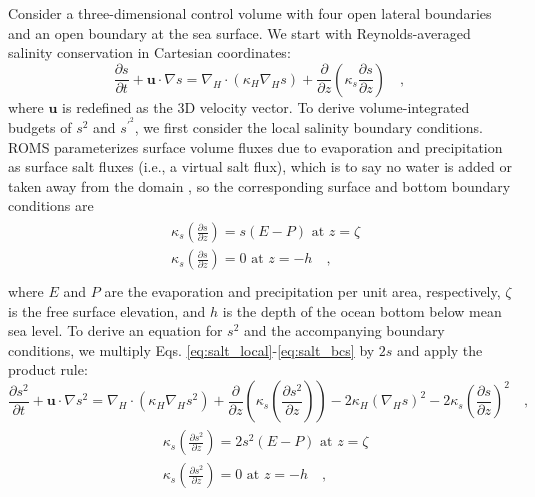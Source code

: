 Consider a three-dimensional control volume with four open lateral boundaries and an open boundary at the sea surface. We start with Reynolds-averaged salinity conservation in Cartesian coordinates:
\begin{equation} \label{eq:salt_local}
    \frac{\partial s}{\partial t}+ \textbf{u} \cdot \nabla s =\nabla_H \cdot (\kappa_H \nabla_H s)+  \frac{\partial}{\partial z} \left(\kappa_s {\frac{\partial s}{\partial z}} \right) \quad ,
\end{equation}
where $\mathbf{u}$ is redefined as the 3D velocity vector. To derive volume-integrated budgets of $s^2$ and $s^{\prime^2}$, we first consider the local salinity boundary conditions. ROMS parameterizes surface volume fluxes due to evaporation and precipitation as surface salt fluxes (i.e., a virtual salt flux), which is to say no water is added or taken away from the domain \citep{nagy2020regional, roullet2000salt, shchepetkin2005regional}, so the corresponding surface and bottom boundary conditions are
\begin{align} \label{eq:salt_bcs}
    \begin{split}
        & \kappa_s \left({\frac{\partial s}{\partial z}} \right) = s(E-P) \,\, \textrm{at} \,\, z = \zeta \\
        & \kappa_s \left({\frac{\partial s}{\partial z}} \right) = 0 \,\, \textrm{at} \,\, z = -h \quad , \\
    \end{split}
\end{align} 
where $E$ and $P$ are the evaporation and precipitation per unit area, respectively, $\zeta$ is the free surface elevation, and $h$ is the depth of the ocean bottom below mean sea level. To derive an equation for $s^2$ and the accompanying boundary conditions, we multiply Eqs. \ref{eq:salt_local}-\ref{eq:salt_bcs} by $2s$ and apply the product rule:
\begin{equation} \label{eq:s2_local}
    \frac{\partial s^2}{\partial t} + \textbf{u} \cdot \nabla s^2   = \nabla_H \cdot \left(\kappa_H \nabla_H s^2 \right) + \frac{\partial }{\partial z}\left(\kappa_s \left(\frac{\partial s^2}{\partial z} \right) \right) - 2\kappa_H \left(\nabla_H s \right)^2 -2\kappa_s \left(\frac{\partial s}{\partial z} \right)^2 \quad ,
\end{equation}
\begin{align} 
    \begin{split}
        & \kappa_s \left({\frac{\partial s^2}{\partial z}} \right) = 2s^2(E-P) \,\, \textrm{at} \,\, z = \zeta \\
        & \kappa_s \left({\frac{\partial s^2}{\partial z}} \right) = 0 \,\, \textrm{at} \,\, z = -h \label{eq:salt2_bcs} \quad ,
    \end{split}
\end{align}
